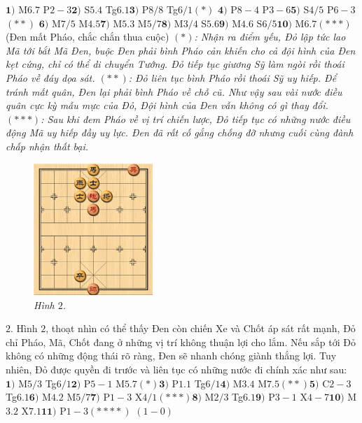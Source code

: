 \begin{multicols}{2}
	\vskip 0.1cm
	$\pmb{1)}$ M$6.7$ P$2-3$\quad  $\pmb{2)}$ S$5.4$ Tg$6.1$\quad $\pmb{3)}$ P$8/8$ Tg$6/1$$(*)$ \quad$\pmb{4)}$ P$8-4$ P$3-6$\quad  $\pmb{5)}$ S$4/5$ P$6-3$$(**)$ \quad$\pmb{6)}$ M$7/5$ M$4.5$\quad $\pmb{7)}$ M$5.3$ M$5/7$\quad  $\pmb{8)}$ M$3/4$ S$5.6$\quad $\pmb{9)}$ M$4.6$ S$6/5$\quad $\pmb{10)}$ M$6.7$$(***)$ (Đen mất Pháo, chắc chắn thua cuộc)
	\vskip 0.1cm
	\textit{$(*)$: Nhận ra điểm yếu, Đỏ lập tức lao Mã tới bắt Mã Đen, buộc Đen phải bình Pháo cản khiến cho cả đội hình của Đen kẹt cứng, chỉ có thể di chuyển Tướng. Đỏ tiếp tục giương Sỹ làm ngòi rồi thoái Pháo về đáy dọa sát.
	\vskip 0.1cm
	$(**)$: Đỏ liên tục bình Pháo rồi thoái Sỹ uy hiếp. Để tránh mất quân, Đen lại phải bình Pháo về chỗ cũ. Như vậy sau vài nước điều quân cực kỳ mẫu mực của Đỏ, Đội hình của Đen vẫn không có gì thay đổi.
	\vskip 0.1cm
	$(***)$: Sau khi đem Pháo về vị trí chiến lược, Đỏ tiếp tục có những nước điều động Mã uy hiếp đầy uy lực. Đen đã rất cố gắng chống đỡ nhưng cuối cùng đành chấp nhận thất bại.}
	\begin{figure}[H]
		\vspace*{-5pt}
		\centering
		\captionsetup{labelformat= empty, justification=centering}
		\includegraphics[width= 0.4\textwidth]{2}
		\caption{\small\textit{\color{gocco}Hình $2$.}}
		\vspace*{-10pt}
	\end{figure}
	$2.$ Hình $2$, thoạt nhìn có thể thấy Đen còn chiến Xe và Chốt áp sát rất mạnh, Đỏ chỉ Pháo, Mã, Chốt đang ở những vị trí không thuận lợi cho lắm. Nếu sắp tới Đỏ không có những động thái rõ ràng, Đen sẽ nhanh chóng giành thắng lợi. Tuy nhiên, Đỏ được quyền đi trước và liên tục có những nước đi chính xác như sau:
	\vskip 0.1cm
	$\pmb{1)}$	M$5/3$ Tg$6/1$\quad $\pmb{2)}$ P$5-1$ M$5.7$$(*)$\quad  $\pmb{3)}$ P$1.1$ Tg$6/1$\quad $\pmb{4)}$ M$3.4$  M$7.5$$(**)$\quad  $\pmb{5)}$ C$2-3$ Tg$6.1$\quad $\pmb{6)}$ M$4.2$ M$5/7$\quad $\pmb{7)}$ P$1-3$ X$4/1$$(***)$\quad $\pmb{8)}$ M$2/3$ Tg$6.1$\quad $\pmb{9)}$ P$3-1$ X$4-7$\quad $\pmb{10)}$ M$3.2$ X$7.1$\quad $\pmb{11)}$ P$1-3$$(****)$ $(1-0)$
$$
\end{multicols}
